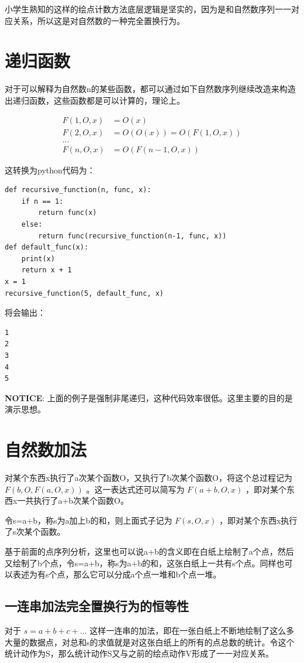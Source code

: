 \documentclass[12pt,oneside]{book}
\begin{document}
小学生熟知的这样的绘点计数方法底层逻辑是坚实的，因为是和自然数序列一一对应关系，所以这是对自然数的一种完全置换行为。



\section{递归函数}
对于可以解释为自然数n的某些函数，都可以通过如下自然数序列继续改造来构造出递归函数，这些函数都是可以计算的，理论上。

\begin{align*}
F(1, O, x) &= O(x)\\
F(2, O, x) &= O(O(x)) = O(F(1, O, x))\\
...\\
F(n, O, x) &= O(F(n-1, O, x))
\end{align*}

这转换为python代码为：
\begin{verbatim}
def recursive_function(n, func, x):
    if n == 1:
        return func(x)
    else:
        return func(recursive_function(n-1, func, x))
def default_func(x):
    print(x)
    return x + 1
x = 1
recursive_function(5, default_func, x)
\end{verbatim}

将会输出：
\begin{Verbatim}
1
2
3
4
5
\end{Verbatim}

\textbf{NOTICE}: 上面的例子是强制非尾递归，这种代码效率很低。这里主要的目的是演示思想。

\section{自然数加法}
对某个东西x执行了a次某个函数O，又执行了b次某个函数O，将这个总过程记为 $F(b, O, F(a, O, x))$ 。这一表达式还可以简写为 $F(a+b, O, x)$ ，即对某个东西x一共执行了a+b次某个函数O。

令s=a+b，称s为a加上b的和，则上面式子记为 $F(s, O, x)$ ，即对某个东西x执行了s次某个函数。

基于前面的点序列分析，这里也可以说a+b的含义即在白纸上绘制了a个点，然后又绘制了b个点，令s=a+b，称s为a+b的和，这张白纸上一共有s个点。同样也可以表述为有s个点，那么它可以分成a个点一堆和b个点一堆。

\subsection{一连串加法完全置换行为的恒等性}
对于 $s=a+b+c+...$ 这样一连串的加法，即在一张白纸上不断地绘制了这么多大量的数据点，对总和s的求值就是对这张白纸上的所有的点总数的统计。令这个统计动作为S，那么统计动作S又与之前的绘点动作V形成了一一对应关系。
\end{document}
